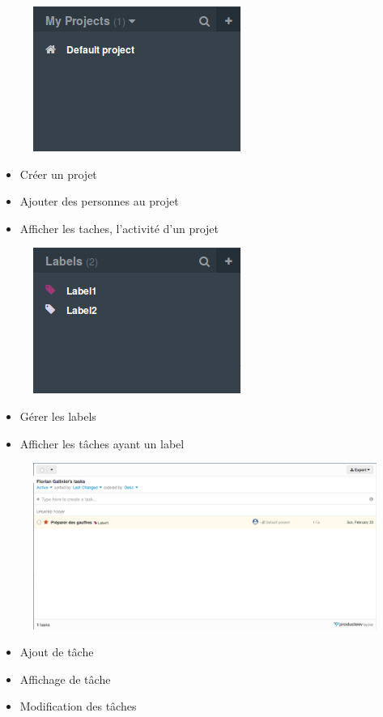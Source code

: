\begin{frame}
   \begin{figure}
    \includegraphics[scale=0.90]{img/projet.png}
  \end{figure}
  \begin{itemize}
    \item Créer un projet
    \item Ajouter des personnes au projet
    \item Afficher les taches, l'activité d'un projet
  \end{itemize}
\end{frame}

\begin{frame}
   \begin{figure}
    \includegraphics[scale=0.90]{img/label.png}
  \end{figure}
  \begin{itemize}
    \item Gérer les labels
    \item Afficher les tâches ayant un label
  \end{itemize}
\end{frame}

\begin{frame}
   \begin{figure}
    \includegraphics[scale=0.25]{img/principale.png}
  \end{figure}
  \begin{itemize}
    \item Ajout de tâche
    \item Affichage de tâche
    \item Modification des tâches
  \end{itemize}  
\end{frame}